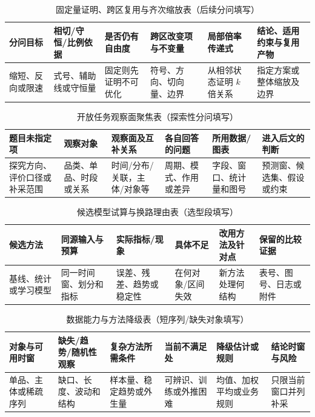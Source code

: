 \documentclass[withoutpreface,bwprint]{cumcmthesis}
\begin{document}
  \begin{table}[H]
    \centering
    \small
    \setlength{\tabcolsep}{3.0pt}
    \caption{固定量证明、跨区复用与齐次缩放表（后续分问填写）}
    \label{tab:invariant-homogeneity-guide}
    \begin{tabular}{p{1.85cm}p{2.1cm}p{2.15cm}p{2.25cm}p{2.15cm}p{2.45cm}}
      \toprule
      分问目标 & 相切/守恒/比例依据 & 是否仍有自由度 & 跨区改变项与不变量 & 局部倍率传递式 & 结论、适用约束与复用产物 \\
      \midrule
      缩短、反向或限速 & 式号、辅助线或守恒量 & 固定则先证明不可优化 & 符号、方向、切向量、边界 & 从相邻状态证明 $k$ 倍关系 & 指定方案或整体缩放及边界 \\
      \bottomrule
    \end{tabular}
  \end{table}
  \begin{table}[H]
    \centering
    \small
    \setlength{\tabcolsep}{3.2pt}
    \caption{开放任务观察面聚焦表（探索性分问填写）}
    \label{tab:open-question-focus-guide}
    \begin{tabular}{p{1.8cm}p{2.15cm}p{2.3cm}p{2.3cm}p{2.25cm}p{2.2cm}}
      \toprule
      题目未指定项 & 观察对象 & 观察面及互补关系 & 各自回答的问题 & 所用数据/图表 & 进入后文的判断 \\
      \midrule
      探究方向、评价口径或补采范围 & 品类、单品、时段或关系 & 时间/分布/关联，主体/对象等 & 周期、模式、作用或差异 & 字段、窗口、统计量和图号 & 预测窗、候选集、假设或约束 \\
      \bottomrule
    \end{tabular}
  \end{table}
  \begin{table}[H]
    \centering
    \small
    \setlength{\tabcolsep}{3.2pt}
    \caption{候选模型试算与换路理由表（选型段填写）}
    \label{tab:candidate-model-switch-guide}
    \begin{tabular}{p{2.0cm}p{2.15cm}p{2.15cm}p{2.35cm}p{2.25cm}p{2.1cm}}
      \toprule
      候选方法 & 同源输入与预算 & 实际指标/现象 & 具体不足 & 改用方法及针对点 & 保留的比较证据 \\
      \midrule
      基线、统计或学习模型 & 同一时间窗、划分和指标 & 误差、残差、趋势或稳定性 & 在何对象/区间失效 & 新方法处理何结构 & 表号、图号、日志或附件 \\
      \bottomrule
    \end{tabular}
  \end{table}
  \begin{table}[H]
    \centering
    \small
    \setlength{\tabcolsep}{3.2pt}
    \caption{数据能力与方法降级表（短序列/缺失对象填写）}
    \label{tab:data-capability-downgrade-guide}
    \begin{tabular}{p{2.1cm}p{2.2cm}p{2.2cm}p{2.35cm}p{2.15cm}p{2.1cm}}
      \toprule
      对象与可用时窗 & 缺失/趋势/随机性观察 & 复杂方法所需条件 & 当前不满足处 & 降级估计或规则 & 结论时窗与风险 \\
      \midrule
      单品、主体或稀疏序列 & 缺口、长度、波动和结构 & 样本量、稳定趋势或外生量 & 可辨识、训练或外推困难 & 均值、加权平均或业务规则 & 只限当前窗口并列补采 \\
      \bottomrule
    \end{tabular}
  \end{table}
\end{document}
